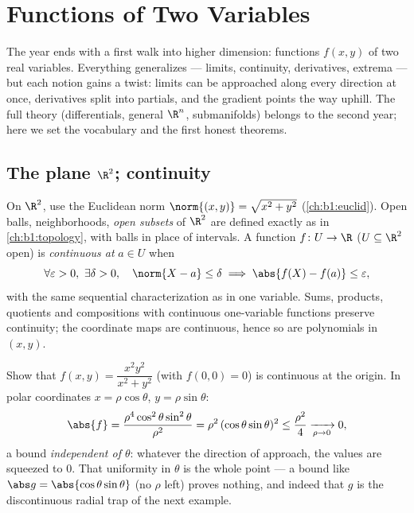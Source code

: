 \chapter{Functions of Two Variables}\label{ch:b1:multivar}

The year ends with a first walk into higher dimension: functions
$f(x, y)$ of two real variables. Everything generalizes --- limits,
continuity, derivatives, extrema --- but each notion gains a twist:
limits can be approached along every direction at once, derivatives
split into partials, and the gradient points the way uphill. The
full theory (differentials, general $\R^n$, submanifolds) belongs to
the second year; here we set the vocabulary and the first honest
theorems.

\section{The plane $\R^2$; continuity}

\begin{definition}\label{def:b1:multivar:topology}
On $\R^2$, use the Euclidean norm $\norm{(x,y)} = \sqrt{x^2 + y^2}$
(\cref{ch:b1:euclid}). Open balls, neighborhoods, \emph{open
subsets} of $\R^2$ are defined exactly as in
\cref{ch:b1:topology}, with balls in place of intervals. A function
$f \colon U \to \R$ ($U \subseteq \R^2$ open) is \emph{continuous
at} $a \in U$ when
\[
\forall\varepsilon > 0,\ \exists\delta > 0, \quad
\norm{X - a} \leq \delta \implies \abs{f(X) - f(a)} \leq
\varepsilon,
\]
with the same sequential characterization as in one variable.
Sums, products, quotients and compositions with continuous
one-variable functions preserve continuity; the coordinate maps are
continuous, hence so are polynomials in $(x,y)$.
\end{definition}

\begin{example}
\label{ex:b1:multivar:polarbound}
Show that $f(x, y) = \dfrac{x^2y^2}{x^2 + y^2}$ (with $f(0,0) =
0$) is continuous at the origin. In polar coordinates $x =
\rho\cos\theta$, $y = \rho\sin\theta$:
\[
\abs{f} = \frac{\rho^4\cos^2\theta\sin^2\theta}{\rho^2}
= \rho^2\,(\cos\theta\sin\theta)^2 \leq \frac{\rho^2}{4}
\xrightarrow[\rho \to 0]{} 0 ,
\]
a bound \emph{independent of $\theta$}: whatever the direction
of approach, the values are squeezed to $0$. That uniformity in
$\theta$ is the whole point --- a bound like $\abs g =
\abs{\cos\theta\sin\theta}$ (no $\rho$ left) proves nothing,
and indeed that $g$ is the discontinuous radial trap of the
next example.
\end{example}

